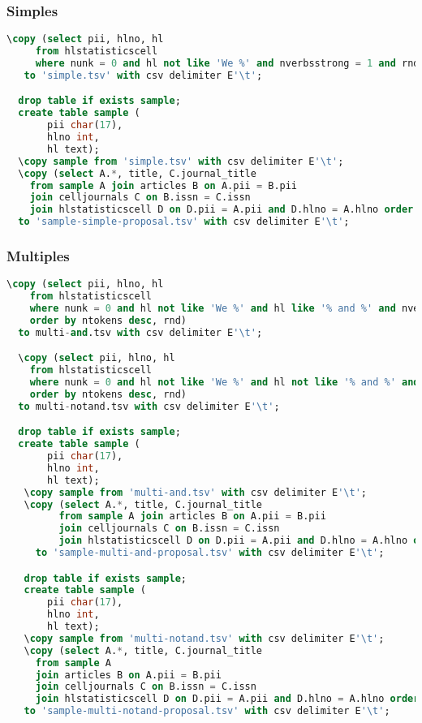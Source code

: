 \documentclass[a4paper,11pt]{report}
\begin{document}
\subsubsection*{Simples}
\begin{lstlisting}[language=SQL]
  \copy (select pii, hlno, hl
     from hlstatisticscell
     where nunk = 0 and hl not like 'We %' and nverbsstrong = 1 and rnd> 0.98 order by rnd)
   to 'simple.tsv' with csv delimiter E'\t';

  drop table if exists sample;
  create table sample (
       pii char(17),
       hlno int,
       hl text);
  \copy sample from 'simple.tsv' with csv delimiter E'\t';
  \copy (select A.*, title, C.journal_title
    from sample A join articles B on A.pii = B.pii
    join celljournals C on B.issn = C.issn
    join hlstatisticscell D on D.pii = A.pii and D.hlno = A.hlno order by D.rnd)
  to 'sample-simple-proposal.tsv' with csv delimiter E'\t';   
\end{lstlisting}

\subsubsection{Multiples}
\begin{lstlisting}[language=SQL]
  \copy (select pii, hlno, hl
    from hlstatisticscell
    where nunk = 0 and hl not like 'We %' and hl like '% and %' and nverbsstrong > 2
    order by ntokens desc, rnd)
  to multi-and.tsv with csv delimiter E'\t';

  \copy (select pii, hlno, hl
    from hlstatisticscell
    where nunk = 0 and hl not like 'We %' and hl not like '% and %' and nverbsstrong > 2
    order by ntokens desc, rnd)
  to multi-notand.tsv with csv delimiter E'\t';

  drop table if exists sample;
  create table sample (
       pii char(17),
       hlno int,
       hl text);
   \copy sample from 'multi-and.tsv' with csv delimiter E'\t';
   \copy (select A.*, title, C.journal_title
         from sample A join articles B on A.pii = B.pii
         join celljournals C on B.issn = C.issn
         join hlstatisticscell D on D.pii = A.pii and D.hlno = A.hlno order by D.rnd)
     to 'sample-multi-and-proposal.tsv' with csv delimiter E'\t';

   drop table if exists sample;
   create table sample (
       pii char(17),
       hlno int,
       hl text);
   \copy sample from 'multi-notand.tsv' with csv delimiter E'\t';
   \copy (select A.*, title, C.journal_title
     from sample A
     join articles B on A.pii = B.pii
     join celljournals C on B.issn = C.issn
     join hlstatisticscell D on D.pii = A.pii and D.hlno = A.hlno order by D.rnd)
   to 'sample-multi-notand-proposal.tsv' with csv delimiter E'\t';
\end{lstlisting}
\end{document}
